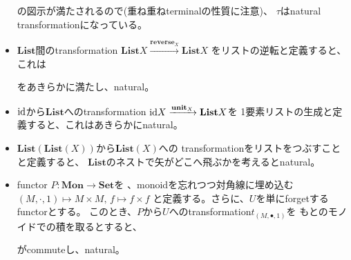 \documentclass[9pt]{ltjsarticle}
\renewcommand{\bf}{\mathbf}
\begin{document}
\begin{itemize}
  の図示が満たされるので(重ね重ねterminalの性質に注意)、
  $\tau$はnatural transformationになっている。
  \item
  $\bf{List}$間のtransformation
  $\bf{List}X \xrightarrow{\bf{reverse}_X} \bf{List}X$
  をリストの逆転と定義すると、これは
  をあきらかに満たし、natural。
  \item
  $\mathrm{id}$から$\bf{List}$へのtransformation
  $\id X \xrightarrow{\bf{unit}_X} \bf{List} X$を
  1要素リストの生成と定義すると、これはあきらかにnatural。
  \item
  $\bf{List}(\bf{List}(X))$から$\bf{List}(X)$への
  transformationをリストをつぶすことと定義すると、
  $\bf{List}$のネストで矢がどこへ飛ぶかを考えるとnatural。
  \item
  functor $P\colon \bf{Mon}\to \bf{Set}$を
  、monoidを忘れつつ対角線に埋め込む
  $(M,\cdot,1)\mapsto M\times M,\, f\mapsto f\times f$
  と定義する。さらに、$U$を単にforgetするfunctorとする。
  このとき、$P$から$U$へのtransformation$t_{(M,\bullet,1)}$を
  もとのモノイドでの積を取るとすると、
  がcommuteし、natural。

\end{itemize}
\end{document}
